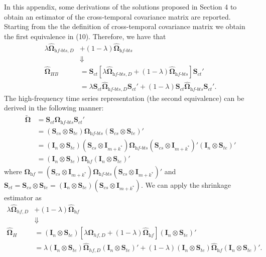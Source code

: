 \documentclass[a4paper,11pt]{article}
\newcommand{\Ivet}{\bm{I}}
\newcommand{\Svet}{\bm{S}}
\newcommand{\Omegavet}{\bm{\Omega}}
\theoremstyle{definition}
\begin{document}
In this appendix, some derivations of the solutions proposed in Section 4 to obtain an estimator of the cross-temporal covariance matrix are reported.
Starting from the the definition of cross-temporal covariance matrix we obtain the first equivalence in (10). Therefore, we have that
\begin{align*}
	\lambda \widehat{\Omegavet}_{\textit{hf-bts}, D} &+ (1-\lambda) \widehat{\Omegavet}_{\textit{hf-bts}}\\
	&\Downarrow\\
	\widehat{\Omegavet}_{HB} & = \Svet_{ct}\left[\lambda \widehat{\Omegavet}_{\textit{hf-bts}, D} + (1-\lambda) \widehat{\Omegavet}_{\textit{hf-bts}}\right]\Svet_{ct}'                                                                        \\
	                         & = \lambda \Svet_{ct}\widehat{\Omegavet}_{\textit{hf-bts}, D}\Svet_{ct}'+ (1-\lambda) \Svet_{ct}\widehat{\Omegavet}_{\textit{hf-bts}}\Svet_{ct}'.
\end{align*}
The high-frequency time series representation (the second equivalence) can be derived in the following manner:
\begin{align*}
	\widetilde{\Omegavet} & = \Svet_{ct}\Omegavet_{\textit{hf-bts}}\Svet_{ct}'                                                                                                                                                            \\
	          & = \left(\Svet_{cs} \otimes \Svet_{te}\right)\Omegavet_{\textit{hf-bts}}\left(\Svet_{cs} \otimes \Svet_{te}\right)'                                                                                            \\
	          & = \left(\Ivet_n \otimes \Svet_{te}\right)\left(\Svet_{cs} \otimes \Ivet_{m+k^\ast}\right)\Omegavet_{\textit{hf-bts}}\left(\Svet_{cs} \otimes \Ivet_{m+k^\ast}\right)'\left(\Ivet_n \otimes \Svet_{te}\right)' \\
	          & = \left(\Ivet_n \otimes \Svet_{te}\right)\Omegavet_{\textit{hf}}\left(\Ivet_n \otimes \Svet_{te}\right)'
\end{align*}
where $\Omegavet_{\textit{hf}} = \left(\Svet_{cs} \otimes \Ivet_{m+k^\ast}\right)\Omegavet_{\textit{hf-bts}}\left(\Svet_{cs} \otimes \Ivet_{m+k^\ast}\right)'$ and $\Svet_{ct} = \Svet_{cs} \otimes \Svet_{te} = \left(\Ivet_n \otimes \Svet_{te}\right)\left(\Svet_{cs} \otimes \Ivet_{m+k^\ast}\right)$. We can apply the shrinkage estimator as
\begin{align*}
	\lambda \widehat{\Omegavet}_{hf, D} &+ (1-\lambda) \widehat{\Omegavet}_{\textit{hf}}\\
	&\Downarrow\\
	\widehat{\Omegavet}_{H} & = (\Ivet_{n} \otimes \Svet_{te})\left[\lambda \widehat{\Omegavet}_{hf, D} + (1-\lambda) \widehat{\Omegavet}_{\textit{hf}}\right] (\Ivet_{n} \otimes \Svet_{te})'                                                                                                            \\
	                        & = \lambda (\Ivet_{n} \otimes \Svet_{te})\widehat{\Omegavet}_{hf, D}(\Ivet_{n} \otimes \Svet_{te})' + (1-\lambda) (\Ivet_{n} \otimes \Svet_{te})\widehat{\Omegavet}_{\textit{hf}}(\Ivet_{n} \otimes \Svet_{te})'.
\end{align*}
\end{document}
